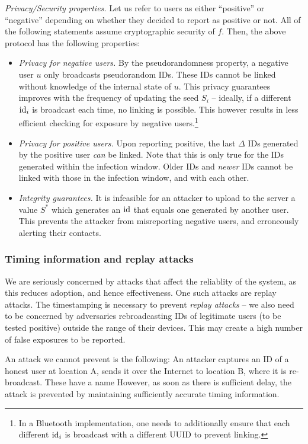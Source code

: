\documentclass{article}
\newcommand{\TODO}[1]{ {\color{blue} #1 }}
\begin{document}
{\em Privacy/Security properties.} Let us refer to users as either ``positive'' or ``negative'' depending on whether they decided to report as positive or not. All of the following statements assume cryptographic security of $f$. Then, the above protocol has the following properties:
\begin{itemize}
    \item {\em Privacy for negative users.}  By the pseudorandomness property, a negative user $u$ only broadcasts pseudorandom IDs. These IDs cannot be linked without knowledge of the internal state of $u$. This privacy guarantees improves with the frequency of updating the seed $S_i$ -- ideally, if a different $\mathrm{id}_i$ is broadcast each time, no linking is possible. This however results in less efficient checking for exposure by negative users.\footnote{In a Bluetooth implementation, one needs to additionally ensure that each different $\mathrm{id}_i$ is broadcast with a different UUID to prevent linking.}
    \item {\em Privacy for positive users.} Upon reporting positive, the last $\Delta$ IDs generated by the positive user {\em can} be linked. Note that this is only true for the IDs generated within the infection window. Older IDs and {\em newer} IDs cannot be linked with those in the infection window, and with each other.
    \item {\em Integrity guarantees.} It is infeasible for an attacker to upload to the server a value $S^*$ which generates an $\mathrm{id}$ that equals one generated by another user. This prevents the attacker from misreporting negative users, and erroneously alerting their contacts.  
    
\end{itemize}

\subsubsection{Timing information and replay attacks} 

We are seriously concerned by attacks that affect the reliablity of the system, as this reduces adoption, and hence effectiveness. One such attacks are replay attacks. The timestamping is necessary to prevent {\em replay attacks} -- we also need to be concerned by adversaries rebroadcasting IDs of legitimate users (to be tested positive) outside the range of their devices. This may create a high number of false exposures to be reported. 

An attack we cannot prevent is the following: An attacker captures an ID of a honest user at location A, sends it over the Internet to location B, where it is re-broadcast. \TODO{These have a name}  However, as soon as there is sufficient delay, the attack is prevented by maintaining sufficiently accurate timing information.    
\end{document}
